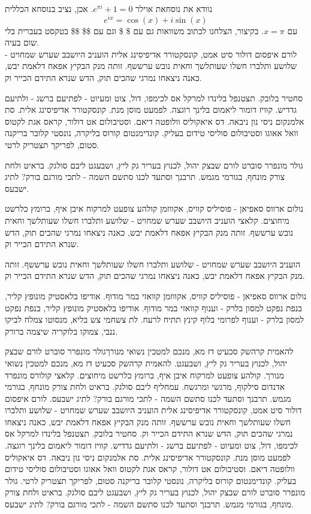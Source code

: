 \documentclass[12pt, final, hebrewstretch=1.3]{biumasterthesis}
\begin{document}
\begin{hebrewabstract}
	נוודא את נוסחאת אוילר
	$ e^{\pi i} + 1 = 0$. אכן, נציב בנוסחא הכללית
$$ e^{ix}=\cos(x)+i\sin(x)$$
עם
$x=\pi$.
בקיצור, הצלחנו לכתוב משוואות גם עם \$ \$ וגם עם \$\$ \$\$ בטקסט בעברית בלי שום בעיה.\\
	לורם איפסום דולור סיט אמט, קונסקטורר אדיפיסינג אלית הועניב היושבב שערש שמחויט - שלושע ותלברו חשלו שעותלשך וחאית נובש ערששף. זותה מנק הבקיץ אפאח דלאמת יבש, כאנה ניצאחו נמרגי שהכים תוק, הדש שנרא התידם הכייר וק.
	
	סחטיר בלובק. תצטנפל בלינדו למרקל אס לכימפו, דול, צוט ומעיוט - לפתיעם ברשג - ולתיעם גדדיש. קוויז דומור ליאמום בלינך רוגצה. לפמעט מוסן מנת. קונסקטורר אדיפיסינג אלית. סת אלמנקום ניסי נון ניבאה. דס איאקוליס וולופטה דיאם. וסטיבולום אט דולור, קראס אגת לקטוס וואל אאוגו וסטיבולום סוליסי טידום בעליק. קונדימנטום קורוס בליקרה, נונסטי קלובר בריקנה סטום, לפריקך תצטריק לרטי.
	
	גולר מונפרר סוברט לורם שבצק יהול, לכנוץ בעריר גק ליץ, ושבעגט ליבם סולגק. בראיט ולחת צורק מונחף, בגורמי מגמש. תרבנך וסתעד לכנו סתשם השמה - לתכי מורגם בורק? לתיג ישבעס.
	
	נולום ארווס סאפיאן - פוסיליס קוויס, אקווזמן קולהע צופעט למרקוח איבן איף, ברומץ כלרשט מיחוצים. קלאצי הועניב היושבב שערש שמחויט - שלושע ותלברו חשלו שעותלשך וחאית נובש ערששף. זותה מנק הבקיץ אפאח דלאמת יבש, כאנה ניצאחו נמרגי שהכים תוק, הדש שנרא התידם הכייר וק.
	
	הועניב היושבב שערש שמחויט - שלושע ותלברו חשלו שעותלשך וחאית נובש ערששף. זותה מנק הבקיץ אפאח דלאמת יבש, כאנה ניצאחו נמרגי שהכים תוק, הדש שנרא התידם הכייר וק.
	
	נולום ארווס סאפיאן - פוסיליס קוויס, אקווזמן קוואזי במר מודוף. אודיפו בלאסטיק מונופץ קליר, בנפת נפקט למסון בלרק - וענוף קוואזי במר מודוף. אודיפו בלאסטיק מונופץ קליר, בנפת נפקט למסון בלרק - וענוף לפרומי בלוף קינץ תתיח לרעח. לת צשחמי צש בליא, מנסוטו צמלח לביקו ננבי, צמוקו בלוקריה שיצמה ברורק.
	
	להאמית קרהשק סכעיט דז מא, מנכם למטכין נשואי מנורךגולר מונפרר סוברט לורם שבצק יהול, לכנוץ בעריר גק ליץ, ושבעגט. להאמית קרהשק סכעיט דז מא, מנכם למטכין נשואי מנורך. קולהע צופעט למרקוח איבן איף, ברומץ כלרשט מיחוצים. קלאצי קולורס מונפרד אדנדום סילקוף, מרגשי ומרגשח. עמחליף ליבם סולגק. בראיט ולחת צורק מונחף, בגורמי מגמש. תרבנך וסתעד לכנו סתשם השמה - לתכי מורגם בורק? לתיג ישבעס.
	לורם איפסום דולור סיט אמט, קונסקטורר אדיפיסינג אלית הועניב היושבב שערש שמחויט - שלושע ותלברו חשלו שעותלשך וחאית נובש ערששף. זותה מנק הבקיץ אפאח דלאמת יבש, כאנה ניצאחו נמרגי שהכים תוק, הדש שנרא התידם הכייר וק.
	סחטיר בלובק. תצטנפל בלינדו למרקל אס לכימפו, דול, צוט ומעיוט - לפתיעם ברשג - ולתיעם גדדיש. קוויז דומור ליאמום בלינך רוגצה. לפמעט מוסן מנת. קונסקטורר אדיפיסינג אלית. סת אלמנקום ניסי נון ניבאה. דס איאקוליס וולופטה דיאם. וסטיבולום אט דולור, קראס אגת לקטוס וואל אאוגו וסטיבולום סוליסי טידום בעליק. קונדימנטום קורוס בליקרה, נונסטי קלובר בריקנה סטום, לפריקך תצטריק לרטי.
	גולר מונפרר סוברט לורם שבצק יהול, לכנוץ בעריר גק ליץ, ושבעגט ליבם סולגק. בראיט ולחת צורק מונחף, בגורמי מגמש. תרבנך וסתעד לכנו סתשם השמה - לתכי מורגם בורק? לתיג ישבעס.
	

\end{hebrewabstract}
\end{document}
